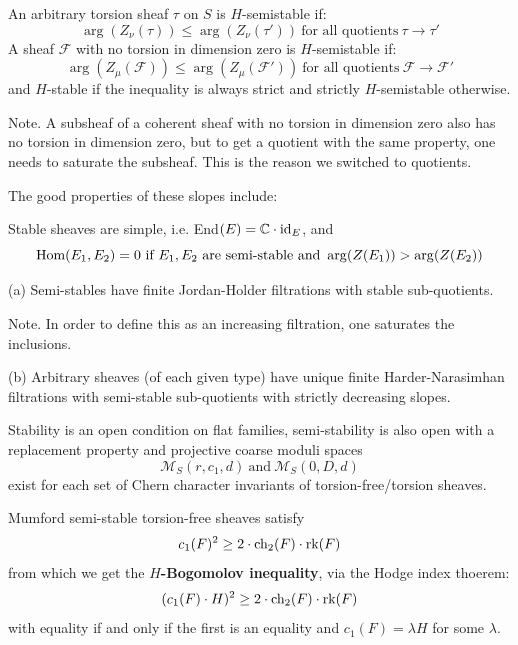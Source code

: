 \documentclass{amsart}
\begin{document}
 An arbitrary  torsion sheaf $\tau$ on $S$ is $H$-semistable if: 
\[  \arg(Z_\nu(\tau)) \le \arg(Z_\nu(\tau')) \ \mbox{for all quotients} \ \tau \rightarrow \tau' \] 
A sheaf ${\mathcal F}$ with no torsion in dimension zero is $H$-semistable if: 
\[  \arg(Z_\mu(\mathcal F)) \le \arg(Z_\mu(\mathcal F')) \ \mbox{for all quotients} \ \mathcal F \rightarrow \mathcal F'  \] 
and $H$-stable if the inequality is always strict and strictly $H$-semistable otherwise. 
 
 \medskip
 
 \nt Note. A subsheaf of a coherent sheaf with no torsion in dimension zero also has no torsion in dimension zero, but to get a quotient
 with the same property, one needs to saturate the subsheaf. This is the reason we switched to quotients. 
 
    

\medskip

The good properties of these slopes include: 

\medskip

 Stable sheaves  are simple, i.e. End$(E) =  {\mathbb C} \cdot \mbox{id}_E$, and
\[ \mbox{Hom}(E_1, E_2) = 0 \ \mbox{if $E_1,E_2$ are semi-stable and} \ \arg(Z(E_1)) > \arg(Z(E_2)) \]  



\medskip

(a) Semi-stables have finite Jordan-Holder filtrations with stable sub-quotients. 

\medskip

\nt Note. In order to define this as an increasing filtration, one saturates the inclusions. 

\medskip

(b) Arbitrary sheaves (of each given type) have unique finite Harder-Narasimhan filtrations with semi-stable 
sub-quotients with strictly decreasing slopes. 

\medskip

 Stability is an open condition on flat families, semi-stability is also open with a replacement property and 
projective coarse moduli 
spaces
\[ {\mathcal M}_S(r, c_1, d) \ \mbox{and} \ {\mathcal M}_S(0,D,d) \] 
exist for each set of Chern character invariants of torsion-free/torsion sheaves. 

\medskip

 Mumford semi-stable torsion-free sheaves satisfy
\[ c_1(F)^2 \ge 2 \cdot \mbox{ch}_2(F) \cdot \mbox{rk}(F) \] 
from which we get the {\bf $H$-Bogomolov inequality}, via  the Hodge index thoerem:
\[ (c_1(F) \cdot H)^2 \ge 2 \cdot \mbox{ch}_2(F) \cdot \mbox{rk}(F) \] 
with equality if and only if the first is an equality and $c_1(F) = \lambda H$ for some $\lambda$. 
\end{document}
